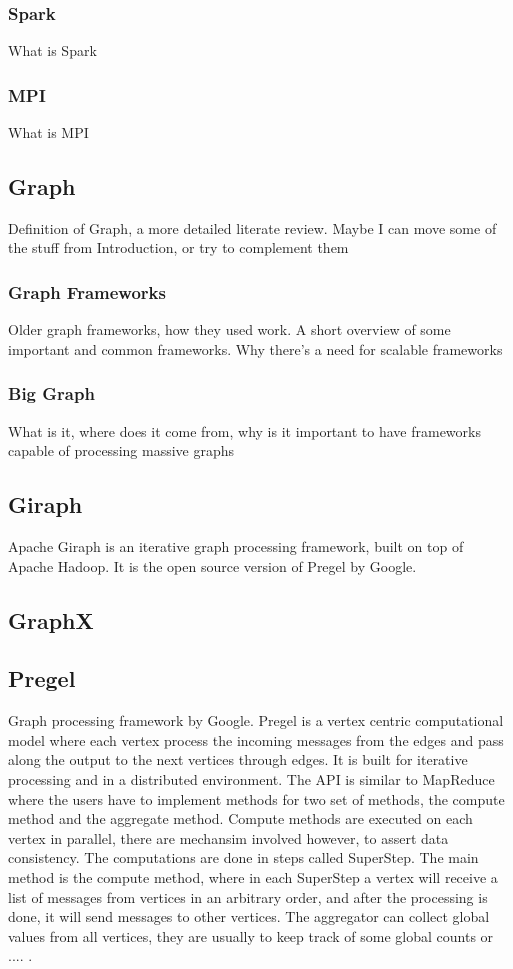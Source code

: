 \documentclass[english]{tktltiki}
\begin{document}
\subsubsection{Spark}
What is Spark
\subsubsection{MPI}
What is MPI

\subsection{Graph}
Definition of Graph, a more detailed literate review. Maybe I can move some of the stuff from Introduction, or try to complement them

\subsubsection{Graph Frameworks}
Older graph frameworks, how they used work. A short overview of some important and common frameworks. Why there's a need for scalable frameworks

\subsubsection{Big Graph}
What is it, where does it come from, why is it important to have frameworks capable of processing massive graphs

\subsection{Giraph}
Apache Giraph is an iterative graph processing framework, built on top of Apache Hadoop. It is the open source version of Pregel by Google. 
\subsection{GraphX}
\subsection{Pregel}
Graph processing framework by Google. Pregel is a vertex centric computational model where each vertex process the incoming messages from the edges and pass along the output to the next vertices through edges. It is built for iterative processing and in a distributed environment. The API is similar to MapReduce where the users have to implement methods for two set of methods, the compute method and the aggregate method. Compute methods are executed on each vertex in parallel, there are mechansim involved however, to assert data consistency. The computations are done in steps called SuperStep. The main method is the compute method, where in each SuperStep a vertex will receive a list of messages from vertices in an arbitrary order, and after the processing is done, it will send messages to other vertices. The aggregator can collect global values from all vertices, they are usually  to keep track of some global counts or .... . 
\end{document}
